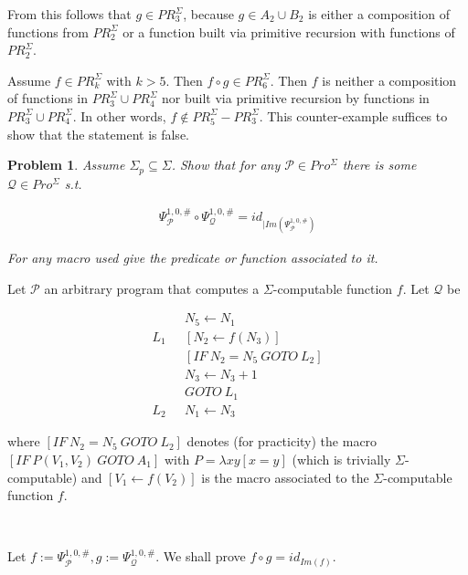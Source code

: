 \documentclass[a4paper, 12pt]{article}
\newtheorem{problem}{Problem}
\newtheorem{problem}{Problem}
\begin{document}
From this follows that $g \in PR_3^{\Sigma}$, because $g \in A_2 \cup B_2$ is
either a composition of functions from $PR_2^{\Sigma}$ or a function built via
primitive recursion with functions of $PR_{2}^{\Sigma}$.

Assume $f \in PR_k^{\Sigma}$ with $k > 5$. Then $f \circ g \in PR_6^{\Sigma}$.
Then $f$ is neither a composition of functions in $PR_3^{\Sigma} \cup
PR_{4}^{\Sigma}$ nor built via primitive recursion by functions in
$PR_3^{\Sigma} \cup PR_4^{\Sigma}$. In other words, $f \not\in PR_5^{\Sigma} -
PR_3^{\Sigma}$. This counter-example suffices to show that the statement is
false.

\pagebreak 

\begin{problem}
    Assume $\Sigma_p \subseteq \Sigma$. Show that for any $\mathcal{P} \in
    Pro^{\Sigma}$ there is some $\mathcal{Q} \in Pro^{\Sigma}$ s.t. 

    \begin{align*}
        \Psi_{\mathcal{P}}^{1, 0, \#} \circ \Psi_{\mathcal{Q}}^{1, 0, \#} =
        id_{| Im(\Psi_{\mathcal{P}}^{1, 0, \#})}
    \end{align*}


    For any macro used give the predicate or function associated to it.
\end{problem}

Let $\mathcal{P}$ an arbitrary program that computes a $\Sigma$-computable
function $f$. Let $\mathcal{Q}$ be

\begin{align*}
    &N_{5} \leftarrow N_1 \\ 
    L_1 ~ ~ ~ &[N_2 \leftarrow f(N_3)] \\ 
    &[IF ~ N_2 = N_5 ~ GOTO ~ L_2 ] \\ 
    &N_3 \leftarrow  N_3 + 1 \\ 
    &GOTO ~ L_1 \\ 
    L_2 ~ ~ ~ &N_1 \leftarrow N_3
\end{align*}

where $[IF ~ N_2 = N_5 ~ GOTO ~ L_2] $ denotes (for practicity) the macro $[IF ~
P(V_1, V_2) ~ GOTO ~ A_1]$ with $P = \lambda xy \left[  x = y \right]$ (which is
trivially $\Sigma$-computable) and $[V_1 \leftarrow f(V_2)]$ is the macro
associated to the $\Sigma$-computable function $f$.

~

Let $f := \Psi_{\mathcal{P}}^{1, 0, \#}, g := \Psi_{\mathcal{Q}}^{1, 0, \#}$. We
shall prove $f \circ g = id_{Im(f)}$.
\end{document}
